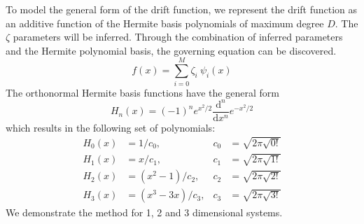 \documentclass[12pt]{article}
\begin{document}
To model the general form of the drift function, we represent the drift function as an additive function of the Hermite basis polynomials of maximum degree $D$. The $\zeta$ parameters will be inferred. Through the combination of inferred parameters and the Hermite polynomial basis, the governing equation can be discovered.
\begin{equation}
f(x) = \sum_{i = 0}^{M} \zeta_i \: \psi_i(x)
\end{equation}
The orthonormal Hermite basis functions have the general form
\begin{equation}
H_n(x) = (-1)^n e^{x^2/2} \dfrac{\mathrm{d}^n}{\mathrm{d}x^n} e^{-x^2/2}
\end{equation}
which results in the following set of polynomials:
\begin{align*}
H_0(x) & = 1 / c_0, & c_0 & = \sqrt{2 \pi \sqrt{0!}} \\
H_1(x) & = x / c_1, & c_1 & = \sqrt{2 \pi \sqrt{1!}} \\
H_2(x) & = (x^2 - 1) / c_2, & c_2 & = \sqrt{2 \pi \sqrt{2!}} \\
H_3(x) & = (x^3 - 3x) / c_3, & c_3 & = \sqrt{2 \pi \sqrt{3!}}
\end{align*}
We demonstrate the method for 1, 2 and 3 dimensional systems. 
\end{document}

